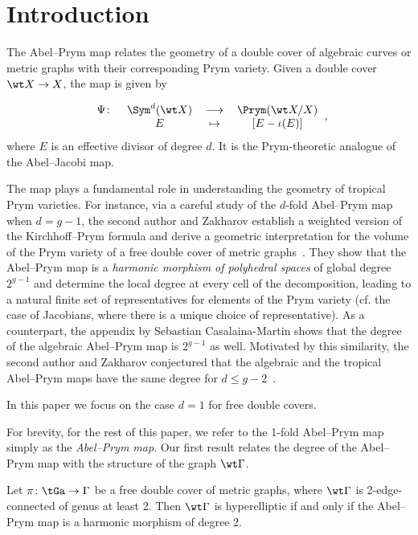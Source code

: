 \section{Introduction}

The Abel--Prym map relates the geometry of a  double cover of algebraic curves or metric graphs  with their corresponding Prym variety. Given a double cover $\wt X\to X$, 
the map is given by 

\[
 \begin{tabular}{cccc}	    $\Psi\colon$&$\Sym^d(\wt X)$&$\longrightarrow$&$\Prym(\wt X/X)$  \\
	         &$E$&$\mapsto$&$[E - \iota(E)]$ \\
	    \end{tabular},
\]
where $E$ is an effective divisor of degree $d$. It is the Prym-theoretic analogue of the Abel--Jacobi map. 


The map plays a fundamental role in understanding the geometry of tropical Prym varieties. 
For instance, via a careful study of the $d$-fold Abel--Prym map  when $d=g-1$, 
the second author and Zakharov establish a weighted version of the Kirchhoff--Prym   formula and derive a geometric interpretation for the volume of the Prym variety of a free double cover of metric graphs~\cite[Theorem 3.4]{LZ22}. 
They show that the Abel--Prym map is a \emph{harmonic morphism of polyhedral spaces} of global degree $2^{g-1}$ and determine the local degree at every cell of the decomposition, leading to a natural finite set of representatives  for elements of the Prym variety (cf. the case of Jacobians, where there is a unique choice of representative). 
As a counterpart, the appendix by Sebastian Casalaina-Martin 
shows that the degree of the algebraic Abel--Prym map is $2^{g-1}$ as well.
Motivated by this similarity, the second author and Zakharov
conjectured that the algebraic and the tropical Abel--Prym maps have the same degree for $d\leq g-2$~\cite[Conjecture 1.1]{LZ22}. 

In this paper we focus on the case $d=1$ for free double covers. 

For brevity, for the rest of this paper, we  refer to the 1-fold Abel--Prym map simply as the \emph{Abel--Prym map}. 
Our first result relates the degree of the Abel--Prym map with the structure of the graph $\wt\Gamma$.



\begin{maintheorem}\label{maintheorem:degreeOfAbelPrym}
    Let $\pi\colon \tGa\to \Gamma$ be a free double cover of  metric graphs, where $\wt\Gamma$ is 2-edge-connected of genus at least 2.  Then $\wt\Gamma$ is hyperelliptic if and only if the Abel--Prym map  
    is a harmonic morphism of degree 2.
    \end{maintheorem}



